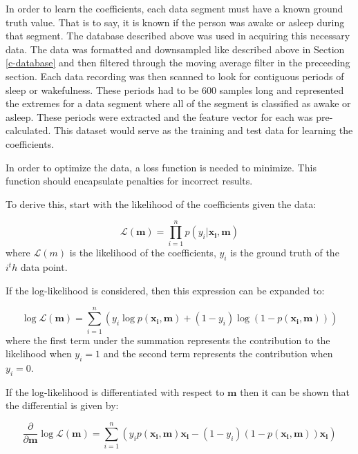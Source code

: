                 In order to learn the coefficients, each data segment must have a known ground truth value. That is to say, it is known if the person was awake or asleep during that segment. The database described above was used in acquiring this necessary data. The data was formatted and downsampled like described above in Section \ref{c-database} and then filtered through the moving average filter in the preceeding section. Each data recording was then scanned to look for contiguous periods of sleep or wakefulness. These periods had to be 600 samples long and represented the extremes for a data segment where all of the segment is classified as awake or asleep. These periods were extracted and the feature vector for each was pre-calculated. This dataset would serve as the training and test data for learning the coefficients. 

                In order to optimize the data, a loss function is needed to minimize. This function should encapsulate penalties for incorrect results. 

                To derive this, start with the likelihood of the coefficients given the data:

                \begin{equation}
                    \mathcal{L}(\mathbf{m}) = \prod_{i=1}^n p(y_i|\mathbf{x_i}, \mathbf{m})
                \end{equation}
                where $\mathcal{L}(m)$ is the likelihood of the coefficients, $y_i$ is the ground truth of the $i^th$ data point.

                If the log-likelihood is considered, then this expression can be expanded to:

                \begin{equation}
                    \log{\mathcal{L}(\mathbf{m})} = \sum_{i=1}^n (y_i\log{p(\mathbf{x_i}, \mathbf{m})} + (1-y_i)\log{(1 - p(\mathbf{x_i}, \mathbf{m}))})
                \end{equation}
                where the first term under the summation represents the contribution to the likelihood when $y_i = 1$ and the second term represents the contribution when $y_i = 0$.

                If the log-likelihood is differentiated with respect to $\mathbf{m}$ then it can be shown that the differential is given by:

                \begin{equation}
                    \frac{\partial}{\partial \mathbf{m}}\log{\mathcal{L}(\mathbf{m})} = \sum_{i=1}^n (y_ip(\mathbf{x_i}, \mathbf{m})\mathbf{x_i} - (1-y_i)(1 -p(\mathbf{x_i},\mathbf{m}))\mathbf{x_i})
                \end{equation}

